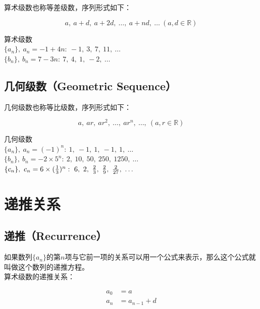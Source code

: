 \documentclass[12pt, openany, oneside]{book}
\begin{document}
算术级数也称等差级数，序列形式如下：

$$
	a,\ a + d,\ a + 2d,\ \dots,\ a + nd,\ \dots\ (a, d \in \mathbb{R})
$$

\begin{tcolorbox}
	算术级数 \\
	$ \{a_n\},\ a_n = -1 + 4n:\ -1,\ 3,\ 7,\ 11,\ \dots $ \\
	$ \{b_n\},\ b_n = 7 - 3n:\ 7,\ 4,\ 1,\ -2,\ \dots $
\end{tcolorbox}

\subsection{几何级数（Geometric Sequence）}

几何级数也称等比级数，序列形式如下：

$$
	a,\ ar,\ ar^2,\ \dots,\ ar^n,\ \dots,\ (a, r \in \mathbb{R})
$$

\begin{tcolorbox}
	几何级数 \\
	$ \{a_n\},\ a_n = (-1)^n:\ 1,\ -1,\ 1,\ -1,\ 1,\ \dots $ \\
	$ \{b_n\},\ b_n = -2 \times 5^n:\ 2,\ 10,\ 50,\ 250,\ 1250,\ \dots $ \\
	$ \{c_n\},\ c_n = 6 \times ({1 \over 3})^n:\ 6,\ 2,\ {2 \over 3},\ {2 \over 9},\ {2 \over 27},\ \dots $
\end{tcolorbox}

\newpage

\section{递推关系}

\subsection{递推（Recurrence）}

如果数列$ \{a_n\} $的第$ n $项与它前一项的关系可以用一个公式来表示，那么这个公式就叫做这个数列的递推方程。 \\

算术级数的递推关系：

\vspace{-1cm}
\begin{align}
	\nonumber
	a_0 & = a           \\
	\nonumber
	a_n & = a_{n-1} + d
\end{align}
\end{document}
